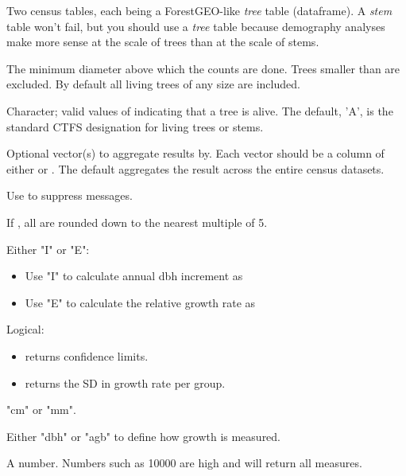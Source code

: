\documentclass[a4paper]{book}
\begin{document}
\begin{Arguments}
\begin{ldescription}
\item[\code{census1, census2}] Two census tables, each being a ForestGEO-like \emph{tree}
table (dataframe). A \emph{stem} table won't fail, but you should use a \emph{tree}
table because demography analyses make more sense at the scale of trees
than at the scale of stems.

\item[\code{mindbh}] The minimum diameter above which the counts are done. Trees
smaller than  are excluded. By default all living trees of any size
are included.

\item[\code{alivecode}] Character; valid values of  indicating that a tree
is alive. The default, 'A', is the standard CTFS designation for living
trees or stems.

\item[\code{split1, split2}] Optional vector(s) to aggregate results by. Each vector
should be a column of either  or . The default aggregates
the result across the entire census datasets.

\item[\code{quiet}] Use  to suppress messages.

\item[\code{rounddown}] If , all  are rounded down to the nearest
multiple of 5.

\item[\code{method}] Either "I" or "E":
\begin{itemize}

\item Use "I" to calculate annual dbh increment as 
\item Use "E" to calculate the relative growth rate as

\end{itemize}


\item[\code{stdev}] Logical:
\begin{itemize}

\item {} returns confidence limits.
\item {} returns the SD in growth rate per group.

\end{itemize}


\item[\code{dbhunit}] "cm" or "mm".

\item[\code{growthcol}] Either "dbh" or "agb" to define how growth is measured.

\item[\code{err.limit, maxgrow}] A number. Numbers such as 10000 are high and will
return all measures.
\end{ldescription}
\end{Arguments}
\end{document}
